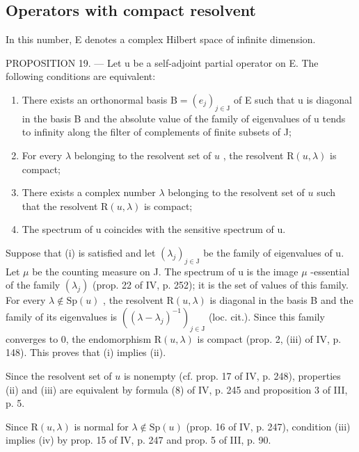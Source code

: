 \subsection{Operators with compact resolvent}

In this number, E denotes a complex Hilbert space of infinite dimension.

PROPOSITION 19. --- Let u be a self-adjoint partial operator on E. The following conditions are equivalent:

\begin{enumerate}
\def\labelenumi{(\roman{enumi})}
\item
  There exists an orthonormal basis \(\mathrm{B} = (e_{j})_{j \in \mathrm{J}}\) of E such that u is diagonal in the basis B and the absolute value of the family of eigenvalues of u tends to infinity along the filter of complements of finite subsets of J;
\item
  For every \(\lambda\) belonging to the resolvent set of \(u\) , the resolvent \(\mathrm{R}(u,\lambda)\) is compact;
\item
  There exists a complex number \(\lambda\) belonging to the resolvent set of \(u\) such that the resolvent \(\mathrm{R}(u,\lambda)\) is compact;
\item
  The spectrum of u coincides with the sensitive spectrum of u.
\end{enumerate}

Suppose that (i) is satisfied and let \((\lambda_{j})_{j\in\mathrm{J}}\) be the family of eigenvalues of u. Let \(\mu\) be the counting measure on J. The spectrum of u is the image \(\mu\) -essential of the family \((\lambda_{j})\) (prop. 22 of IV, p. 252); it is the set of values of this family. For every \(\lambda\notin\mathrm{Sp}(u)\) , the resolvent \(\mathrm{R}(u,\lambda)\) is diagonal in the basis B and the family of its eigenvalues is \(((\lambda-\lambda_{j})^{-1})_{j\in\mathrm{J}}\) (loc. cit.). Since this family converges to 0, the endomorphism \(\mathrm{R}(u,\lambda)\) is compact (prop. 2, (iii) of IV, p. 148). This proves that (i) implies (ii).

Since the resolvent set of \(u\) is nonempty (cf. prop. 17 of IV, p. 248), properties (ii) and (iii) are equivalent by formula (8) of IV, p. 245 and proposition 3 of III, p. 5.

Since \(\mathrm{R}(u,\lambda)\) is normal for \(\lambda\notin\mathrm{Sp}(u)\) (prop. 16 of IV, p. 247), condition (iii) implies (iv) by prop. 15 of IV, p. 247 and prop. 5 of III, p. 90.

